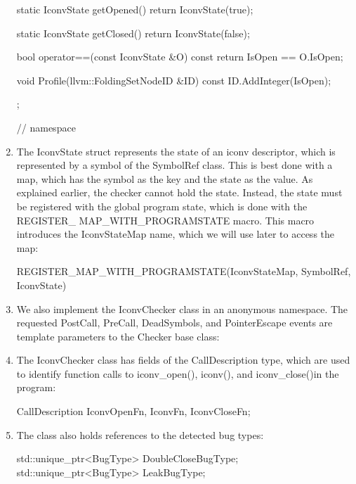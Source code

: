 \begin{enumerate}
\begin{cpp}
{{    static IconvState getOpened() {
        return IconvState(true);
    }

    static IconvState getClosed() {
        return IconvState(false);
    }

    bool operator==(const IconvState &O) const {
        return IsOpen == O.IsOpen;
    }

    void Profile(llvm::FoldingSetNodeID &ID) const {
        ID.AddInteger(IsOpen);
    }
};
} // namespace
\end{cpp}

\item
The IconvState struct represents the state of an iconv descriptor, which is represented by a symbol of the SymbolRef class. This is best done with a map, which has the symbol as the key and the state as the value. As explained earlier, the checker cannot hold the state. Instead, the state must be registered with the global program state, which is done with the REGISTER\_ MAP\_WITH\_PROGRAMSTATE macro. This macro introduces the IconvStateMap name, which we will use later to access the map:

\begin{cpp}
REGISTER_MAP_WITH_PROGRAMSTATE(IconvStateMap, SymbolRef,
                               IconvState)
\end{cpp}

\item
We also implement the IconvChecker class in an anonymous namespace. The requested PostCall, PreCall, DeadSymbols, and PointerEscape events are template parameters to the Checker base class:

\begin{cpp}
namespace {
    class IconvChecker
        : public Checker<check::PostCall, check::PreCall,
                         check::DeadSymbols,
                         check::PointerEscape> {
\end{cpp}

\item
The IconvChecker class has fields of the CallDescription type, which are used to identify function calls to iconv\_open(), iconv(), and iconv\_close()in the program:

\begin{cpp}
    CallDescription IconvOpenFn, IconvFn, IconvCloseFn;
\end{cpp}

\item
The class also holds references to the detected bug types:

\begin{cpp}
    std::unique_ptr<BugType> DoubleCloseBugType;
    std::unique_ptr<BugType> LeakBugType;
\end{cpp}


\end{enumerate}
